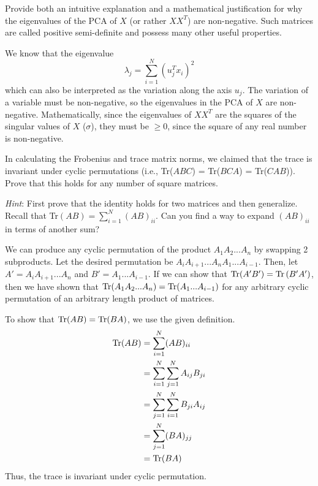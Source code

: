 \problem[4] Provide both an intuitive explanation and a mathematical justification for why the eigenvalues of the PCA of $X$ (or rather $XX^T$) are non-negative. Such matrices are called positive semi-definite and possess many other useful properties.

\begin{solution}
    We know that the eigenvalue
    \[
        \lambda_j = \sum_{i=1}^N (u_j^T x_i)^2
    \]
    which can also be interpreted as the variation along the axis $u_j$. The variation of a variable must be non-negative, so the eigenvalues in the PCA of $X$ are non-negative. Mathematically, since the eigenvalues of $X X^T$ are the squares of the singular values of $X$ ($\sigma$), they must be $\geq 0$, since the square of any real number is non-negative.
\end{solution}

\newpage

\problem[5] In calculating the Frobenius and trace matrix norms, we claimed that the trace is invariant under cyclic permutations (i.e., Tr($ABC$) = Tr($BCA$) = Tr($CAB$)). Prove that this holds for any number of square matrices.

\textit{Hint}: First prove that the identity holds for two matrices and then generalize. Recall that Tr$(AB) = \sum_{i=1}^{N}(AB)_{ii}$. Can you find a way to expand $(AB)_{ii}$ in terms of another sum?

\begin{solution}
    We can produce any cyclic permutation of the product $A_1 A_2 ... A_n$ by swapping 2 subproducts. Let the desired permutation be $A_i A_{i+1} ... A_n A_1 ... A_{i-1}$. Then, let $A' = A_i A_{i+1} ... A_n$ and $B' = A_1 ... A_{i-1}$. If we can show that $\Tr(A' B') = \Tr{(B' A')}$, then we have shown that $\Tr({A_1 A_2 ... A_n}) = \Tr({A_1 ... A_{i-1}})$ for any arbitrary cyclic permutation of an arbitrary length product of matrices.

    To show that $\Tr({A B}) = \Tr({B A})$, we use the given definition.
    \begin{align*}
        \Tr({A B}) &= \sum_{i=1}^N (AB)_{ii}\\
        &= \sum_{i=1}^N \sum_{j=1}^N A_{ij} B_{ji}\\
        &= \sum_{j=1}^N \sum_{i=1}^N B_{ji} A_{ij}\\
        &= \sum_{j=1}^N (B A)_{jj}\\
        &= \Tr({B A})
    \end{align*}
    Thus, the trace is invariant under cyclic permutation.
\end{solution}

